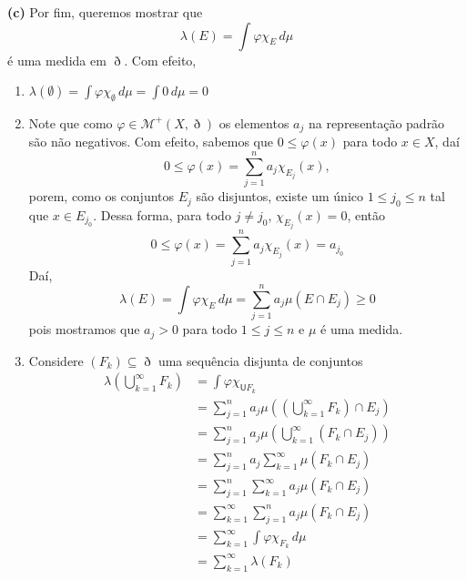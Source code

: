 \documentclass[a4paper, 11pt]{book}
\theoremstyle{definition}
\newcommand{\medcup}{\mathsf{U}}
\newcommand{\cM}{\mathcal{M}}
\begin{document}
\begin{prf}
    \textbf{(c)} Por fim, queremos mostrar que
    \[
        \lambda(E) = \int \varphi \chi_E \, d\mu
    \]
    é uma medida em $\eth$. Com efeito,
    \begin{enumerate}
        \item $\displaystyle \lambda (\emptyset) = \int \varphi \chi_{\emptyset} \, d\mu = \int 0 \, d\mu = 0$
        \item Note que como $\varphi \in \cM^+(X,\eth)$ os elementos $a_j$ na representação padrão são não negativos. Com efeito, sabemos que $0 \leqslant \varphi(x)$ para todo $x \in X$, daí
        \[
            0 \leqslant \varphi(x) = \sum_{j=1}^{n} a_j \chi_{E_j}(x),
        \]
        porem, como os conjuntos $E_j$ são disjuntos, existe um único $1 \leqslant j_0 \leqslant n$ tal que $x \in E_{j_0}$. 
        Dessa forma, para todo $j \neq j_0$, $\chi_{E_j}(x) = 0$, então
        \[
            0 \leqslant \varphi(x) = \sum_{j=1}^{n} a_j \chi_{E_j}(x) = a_{j_0}
        \]
        Daí,
        \[
            \lambda(E) = \int \varphi \chi_{E} \, d\mu = \sum_{j=1}^{n} a_j \mu(E \cap E_j) \geqslant 0
        \]
        pois mostramos que $a_j > 0$ para todo $1 \leqslant j \leqslant n$ e $\mu$ é uma medida.
        \item Considere $(F_k) \subseteq \eth $ uma sequência disjunta de conjuntos
        \[
            \begin{aligned}
                \lambda \left( \bigcup_{k=1}^\infty F_k \right) &= \int \varphi \chi_{\medcup F_k}\\ 
                &= \sum_{j = 1}^{n} a_j \mu \left( \left( \bigcup_{k = 1}^\infty F_k \right) \cap E_j \right)\\
                &= \sum_{j = 1}^{n} a_j \mu \left( \bigcup_{k=1}^\infty (F_k \cap E_j) \right)\\
                &= \sum_{j=1}^{n} a_j \sum_{k=1}^{\infty} \mu(F_k \cap E_j)\\
                &= \sum_{j=1}^{n}\sum_{k=1}^{\infty} a_j  \mu(F_k \cap E_j)\\
                &= \sum_{k=1}^{\infty}\sum_{j=1}^{n} a_j  \mu(F_k \cap E_j)\\
                &= \sum_{k=1}^{\infty} \int \varphi \chi_{F_k} \, d\mu\\
                &= \sum_{k=1}^{\infty} \lambda(F_k)
            \end{aligned}
        \]
    \end{enumerate}
\end{prf}
\end{document}
